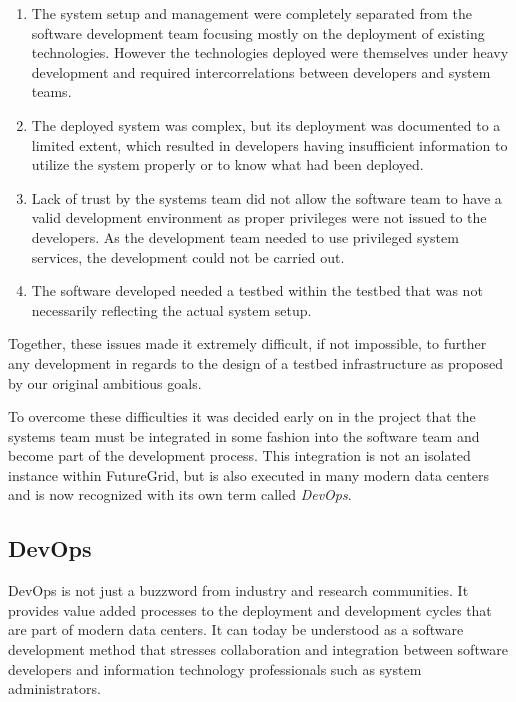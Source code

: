 \documentclass[graybox]{svmult}
\begin{document}
\begin{enumerate}

\item The system setup and management were completely separated from the software development team focusing mostly on the deployment of existing technologies. However the technologies deployed were themselves under heavy development and required intercorrelations between developers and system teams.

\item The deployed system was complex, but its deployment was documented to a limited extent, which resulted in developers having insufficient information to utilize the system properly or to know what had been deployed.

\item Lack of trust by the systems team did not allow the software team to have a valid development environment as proper privileges were not issued to the developers. As the development team needed to use privileged system services, the development could not be carried out.

\item The software developed needed a testbed within the testbed that was not necessarily reflecting the actual system setup.

\end{enumerate}

Together, these issues made it extremely difficult, if not impossible, to further any development in regards to the design of a testbed infrastructure as proposed by our original ambitious goals.

To overcome these difficulties it was decided early on in the project that the systems team must be integrated in some fashion into the software team and become part of the development process. This integration is not an isolated instance within FutureGrid, but is also executed in many modern data centers and is now recognized with its own term called {\em DevOps}.

\subsection{DevOps}

DevOps is not just a buzzword from industry and research communities. It provides value added processes to the deployment and development cycles that are part of modern data centers. It can today be understood as a software development method that stresses collaboration and integration between software developers and information technology professionals such as system administrators.
\end{document}
